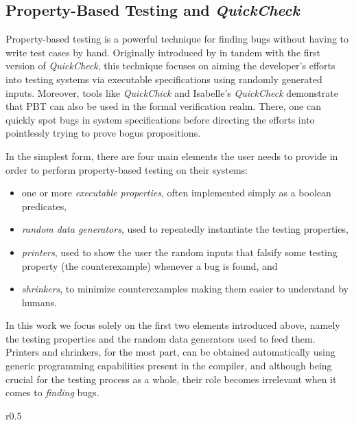 \documentclass[acmsmall, anonymous]{acmart}
\newcommand{\quickcheck}{\textit{QuickCheck}\xspace}
\newcommand{\quickchick}{\textit{QuickChick}\xspace}
\begin{document}
\subsection{Property-Based Testing and \quickcheck}

Property-based testing is a powerful technique for finding bugs without having
to write test cases by hand.
%
Originally introduced by \citet{quickcheck} in tandem with the first version of
\quickcheck, this technique focuses on aiming the developer's efforts into
testing systems via executable specifications using randomly generated inputs.
%
Moreover, tools like \quickchick and Isabelle's \quickcheck demonstrate
that PBT can also be used in the formal verification realm.
%
There, one can quickly spot bugs in system specifications before directing the
efforts into pointlessly trying to prove bogus propositions.


In the simplest form, there are four main elements the user needs to provide in
order to perform property-based testing on their systems:
%
\begin{itemize}
\item one or more \emph{executable properties}, often implemented simply as a
  boolean predicates,
\item \emph{random data generators}, used to repeatedly instantiate the testing
  properties,
\item \emph{printers}, used to show the user the random inputs that falsify some
  testing property (the counterexample) whenever a bug is found, and
\item \emph{shrinkers}, to minimize counterexamples making them easier to
  understand by humans.
\end{itemize}

\noindent In this work we focus solely on the first two elements introduced
above, namely the testing properties and the random data generators used to feed
them.
%
Printers and shrinkers, for the most part, can be obtained automatically using
generic programming capabilities present in the compiler, and although being
crucial for the testing process as a whole, their role becomes irrelevant when
it comes to \emph{finding} bugs.

\begin{wrapfigure}{r}{0.5\textwidth}
\vspace{-10pt}
\begin{algorithm}[H]
  \SetInd{0em}{0.75em}
  \SetAlgoLined
  \DontPrintSemicolon
\caption{\label{algo:quickcheck}\quickcheck Testing Loop}
\end{algorithm}
\vspace{-10pt}
\end{wrapfigure}
\end{document}
